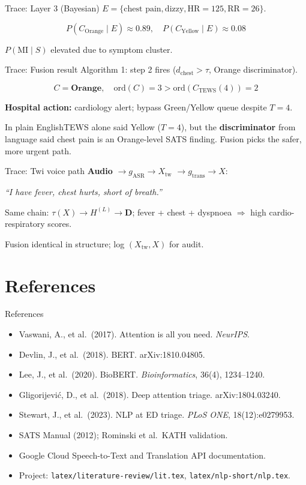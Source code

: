 \documentclass[aspectratio=169,11pt]{beamer}
\newcommand{\plain}[1]{\begin{block}{In plain English}\small #1\end{block}}
\begin{document}
\begin{frame}{Trace: Layer 3 (Bayesian)}
	$E = \{\text{chest pain}, \text{dizzy}, \mathrm{HR}{=}125, \mathrm{RR}{=}26\}$.

	\[
	P(C_{\text{Orange}} \mid E) \approx 0.89,\quad
	P(C_{\text{Yellow}} \mid E) \approx 0.08
\]

	$P(\mathrm{MI}\mid S)$ elevated due to symptom cluster.
\end{frame}

\begin{frame}{Trace: Fusion result}
	Algorithm 1: step 2 fires ($d_{\text{chest}} > \tau$, Orange discriminator).

	\[
	C = \textbf{Orange},\quad \mathrm{ord}(C)=3 > \mathrm{ord}(C_{\text{TEWS}}(4))=2
\]

	\textbf{Hospital action:} cardiology alert; bypass Green/Yellow queue despite $T=4$.

	\plain{TEWS alone said Yellow ($T=4$), but the \textbf{discriminator} from language said chest pain is an Orange-level SATS finding. Fusion picks the safer, more urgent path.}
\end{frame}

\begin{frame}{Trace: Twi voice path}
	\textbf{Audio} $\to g_{\text{ASR}} \to X_{\text{tw}}$ $\to g_{\text{trans}} \to X$:

	\small\textit{``I have fever, chest hurts, short of breath.''}

	Same chain: $\tau(X) \to H^{(L)} \to \mathbf{D}$; fever + chest + dyspnoea $\Rightarrow$ high cardio-respiratory scores.

	Fusion identical in structure; log $(X_{\text{tw}}, X)$ for audit.
\end{frame}

\section{References}

\begin{frame}{References}
	\footnotesize
	\begin{itemize}
		\item Vaswani, A., et al.\ (2017). Attention is all you need. \textit{NeurIPS}.
		\item Devlin, J., et al.\ (2018). BERT. arXiv:1810.04805.
		\item Lee, J., et al.\ (2020). BioBERT. \textit{Bioinformatics}, 36(4), 1234--1240.
		\item Gligorijevi\'c, D., et al.\ (2018). Deep attention triage. arXiv:1804.03240.
		\item Stewart, J., et al.\ (2023). NLP at ED triage. \textit{PLoS ONE}, 18(12):e0279953.
		\item SATS Manual (2012); Rominski et al.\ KATH validation.
		\item Google Cloud Speech-to-Text and Translation API documentation.
		\item Project: \texttt{latex/literature-review/lit.tex}, \texttt{latex/nlp-short/nlp.tex}.
	\end{itemize}
\end{frame}
\end{document}
